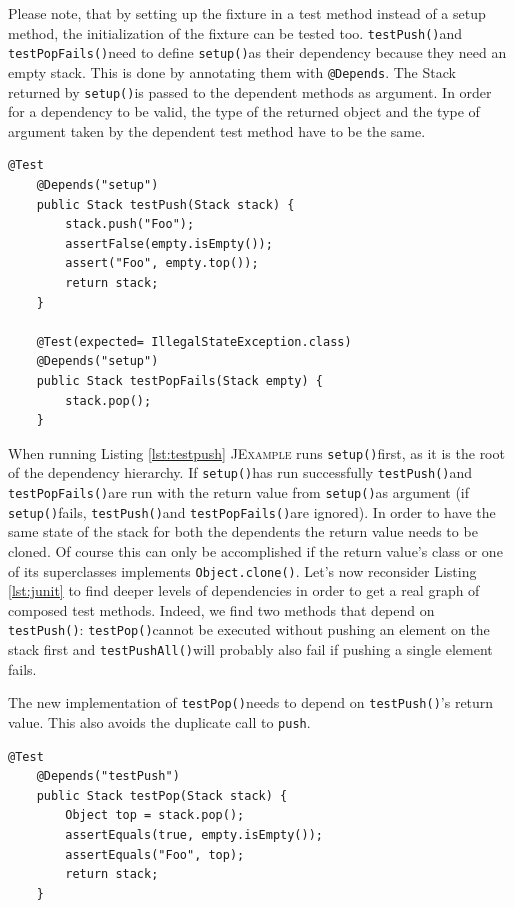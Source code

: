 \documentclass[11pt,a4paper,pdftex]{article}
\newcommand{\JExample}{\textsc{JExample}\xspace}
\newcommand{\ttt}[1]{\texttt{#1}}
\newcommand{\setup}{\ttt{setup()}}
\newcommand{\testPush}{\ttt{testPush()}}
\newcommand{\testPushAll}{\ttt{testPushAll()}}
\newcommand{\testPop}{\ttt{testPop()}}
\newcommand{\testPopFails}{\ttt{testPopFails()}}
\begin{document}
Please note, that by setting up the fixture in a test method instead of a setup method, the initialization of the fixture can be tested too.
\testPush and \testPopFails need to define \setup as their dependency because they need an empty stack. This is done by annotating them with \ttt{@Depends}. The Stack returned by \setup is passed to the dependent methods as argument. In order for a dependency to be valid, the type of the returned object and the type of argument taken by the dependent test method have to be the same.

\begin{lstlisting}[label=lst:testpush,caption=Take another test's result as input value.]
    @Test
    @Depends("setup")
    public Stack testPush(Stack stack) {
        stack.push("Foo");
        assertFalse(empty.isEmpty());
        assert("Foo", empty.top());
        return stack;
    }

    @Test(expected= IllegalStateException.class)
    @Depends("setup")
    public Stack testPopFails(Stack empty) {
        stack.pop();
    }
\end{lstlisting}

When running Listing \ref{lst:testpush} \JExample runs \setup first, as it is the root of the dependency hierarchy. If \setup has run successfully \testPush and \testPopFails are run with the return value from \setup as argument (if \setup fails, \testPush and \testPopFails are ignored).
In order to have the same state of the stack for both the dependents the return value needs to be cloned. Of course this can only be accomplished if the return value's class or one of its superclasses implements \ttt{Object.clone()}.
Let's now reconsider Listing \ref{lst:junit} to find deeper levels of dependencies in order to get a real graph of composed test methods.
Indeed, we find two methods that depend on \testPush: \testPop cannot be executed without pushing an element on the stack first and \testPushAll will probably also fail if pushing a single element fails.

The new implementation of \testPop needs to depend on \testPush's return value. This also avoids the duplicate call to \ttt{push}.

\begin{lstlisting}[label=lst:testpop,caption=Avoid code duplication using dependencies.]
    @Test
    @Depends("testPush")
    public Stack testPop(Stack stack) {
        Object top = stack.pop();
        assertEquals(true, empty.isEmpty());
        assertEquals("Foo", top);
        return stack;
    }
\end{lstlisting}
\end{document}

